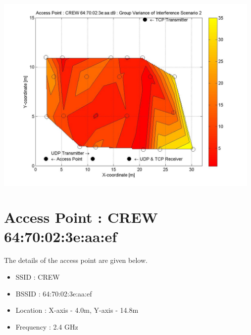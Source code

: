 \documentclass[11pt,a4paper,headinclude,footinclude,chapterprefix=on]{scrreprt}
\begin{document}
\begin{longtable}
	\includegraphics[width=13cm]{../../Source/plot/CREW_d9/d9_Wifi_Group_Variance.jpg} \\
\end{longtable}
\section{Access Point : CREW 64:70:02:3e:aa:ef} 
The details of the access point are given below.
\begin{itemize}
	\item SSID : CREW 
	\item BSSID : 64:70:02:3e:aa:ef 
	\item Location : X-axis - 4.0m, Y-axis - 14.8m 
	\item Frequency : 2.4 GHz 
\end{itemize}
\end{document}
